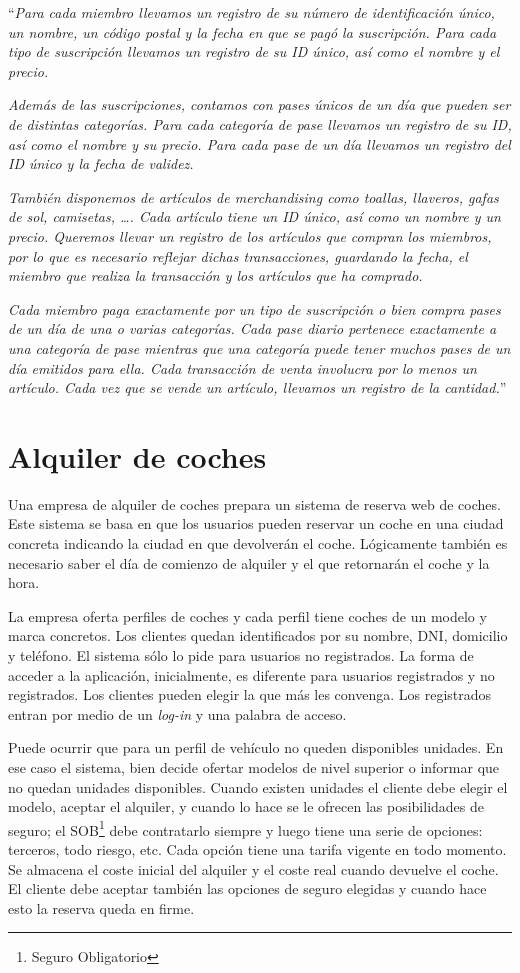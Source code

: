 \documentclass[a4paper]{article}
\begin{document}
``\textit{Para cada miembro llevamos un registro de su número de identificación único, un nombre, un código postal y la fecha en que se pagó la suscripción. Para cada tipo de suscripción llevamos un registro de su ID único, así como el nombre y el precio.} 

\textit{Además de las suscripciones, contamos con pases únicos de un día que pueden ser de distintas categorías. Para cada categoría de pase llevamos un registro de su ID, así como el nombre y su precio. Para cada pase de un día llevamos un registro del ID único y la fecha de validez.}

\textit{También disponemos de artículos de merchandising como toallas, llaveros, gafas de sol, camisetas, \ldots. Cada artículo tiene un ID único, así como un nombre y un precio. Queremos llevar un registro de los artículos que compran los miembros, por lo que es necesario reflejar dichas transacciones, guardando la fecha, el miembro que realiza la transacción y los artículos que ha comprado.}

\textit{Cada miembro paga exactamente por un tipo de suscripción o bien compra pases de un día de una o varias categorías. Cada pase diario pertenece exactamente a una categoría de pase mientras que una categoría puede tener muchos pases de un día emitidos para ella. Cada transacción de venta involucra por lo menos un artículo. Cada vez que se vende un artículo, llevamos un registro de la cantidad.}''

\section{Alquiler de coches}
Una empresa de alquiler de coches prepara un sistema de reserva web de coches. Este sistema se basa en que los usuarios pueden reservar un coche en una ciudad concreta indicando la ciudad en que devolverán el coche. Lógicamente también es necesario saber el día de comienzo de alquiler y el que retornarán el coche y la hora. 

La empresa oferta perfiles de coches y cada perfil tiene coches de un modelo y marca concretos. Los clientes quedan identificados por su nombre, DNI, domicilio y teléfono. El sistema sólo lo pide para usuarios no registrados. La forma de acceder a la aplicación, inicialmente, es diferente para usuarios registrados y no registrados. Los clientes pueden elegir la que más les convenga. Los registrados entran por medio de un \textit{log-in} y una palabra de acceso.

Puede ocurrir que para un perfil de vehículo no queden disponibles unidades. En ese caso el sistema, bien decide ofertar modelos de nivel superior o informar que no quedan unidades disponibles. Cuando existen unidades el cliente debe elegir el modelo, aceptar el alquiler, y cuando lo hace se le ofrecen las posibilidades de seguro; el SOB\footnote{Seguro Obligatorio} debe contratarlo siempre y luego tiene una serie de opciones: terceros, todo riesgo, etc. Cada opción tiene una tarifa vigente en todo momento. Se almacena el coste inicial del alquiler y el coste real cuando devuelve el coche. El cliente debe aceptar también las opciones de seguro elegidas y cuando hace esto la reserva queda en firme. 
\end{document}
